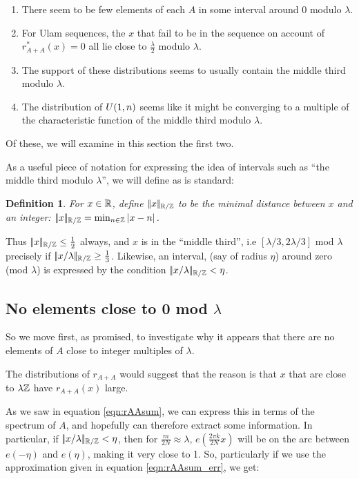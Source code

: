 \documentclass{report}
\newtheorem{definition}[theorem]{Definition}
\theoremstyle{remark}
\numberwithin{equation}{section}
\begin{document}
\begin{enumerate}
\item There seem to be few elements of each $A$ in some interval
  around 0 modulo $\lambda$.
\item For Ulam sequences, the $x$ that fail to be in the sequence on
  account of $r^*_{A+A}(x) = 0$ all lie close to $\frac\lambda2$
  modulo $\lambda$.  
\item The support of these distributions seems to usually contain the
  middle third modulo $\lambda$.  
\item The distribution of $U(1,n)$ seems like it might be
  converging to a multiple of the characteristic function of the
  middle third modulo $\lambda$.  
\end{enumerate}

Of these, we will examine in this section the first two.

As a useful piece of notation for expressing the idea of intervals
such as ``the middle third modulo $\lambda$'', we will define as is
standard:

\begin{definition}
For $x \in \mathbb{R}$, define $|\!|x|\!|_{\mathbb{R}/\mathbb{Z}}$ to be the minimal distance between
$x$ and an integer: $|\!|x|\!|_{\mathbb{R}/\mathbb{Z}} = \min_{n \in \mathbb{Z}} |x-n|$.
\end{definition}

Thus $|\!|x|\!|_{\mathbb{R}/\mathbb{Z}} \leq \frac12$ always, and $x$ is in the ``middle
third'', i.e $[\lambda/3, 2\lambda/3]$ mod $\lambda$ precisely if
$|\!|x/\lambda|\!|_{\mathbb{R}/\mathbb{Z}} \geq \frac13$.  Likewise, an interval, (say of
radius $\eta$) around zero (mod $\lambda$) is expressed by the
condition $|\!|x/\lambda|\!|_{\mathbb{R}/\mathbb{Z}} < \eta$.  

\subsection{No elements close to 0 mod $\lambda$}

So we move first, as promised, to investigate why it appears that
there are no elements of $A$ close to integer multiples of $\lambda$.

The distributions of $r_{A+A}$ would suggest that the reason is that
$x$ that are close to $\lambda\mathbb{Z}$ have $r_{A+A}(x)$ large.  

As we saw in equation \ref{eqn:rAAsum}, we can express this in terms
of the spectrum of $A$, and hopefully can therefore extract some
information.  In particular, if $|\!|x/\lambda|\!|_{\mathbb{R}/\mathbb{Z}} < \eta$, then for
$\frac{m}{2N} \approx \lambda$, $e(\frac{2\pi k}{2N} x)$ will be on
the arc between $e(-\eta)$ and $e(\eta)$, making it very close to 1.
So, particularly if we use the approximation given in equation
\ref{eqn:rAAsum_err}, we get: 
\end{document}
